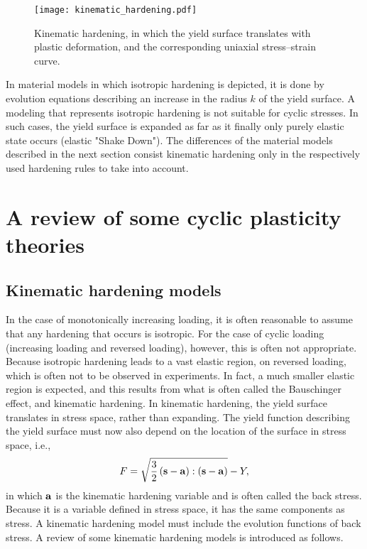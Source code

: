 \begin{figure}[htbp]
	\centering
	\texttt{[image: kinematic\_hardening.pdf]}
	\caption{Kinematic hardening, in which the yield surface translates with plastic deformation, and the corresponding uniaxial stress–strain curve.}
	\label{Fig:kinematic_hardening}
\end{figure}

In material models in which isotropic hardening is depicted, it is done by evolution equations describing an increase in the radius $k$ of the yield surface.
A modeling that represents isotropic hardening is not suitable for cyclic stresses.
In such cases, the yield surface is expanded as far as it finally only purely elastic state occurs (elastic "Shake Down").
The differences of the material models described in the next section consist kinematic hardening only in the respectively used hardening rules to take into account.

\section{A review of some cyclic plasticity theories}
\subsection{Kinematic hardening models}
\noindent
In the case of monotonically increasing loading, it is often reasonable to assume that any hardening that occurs is isotropic.
For the case of cyclic loading (increasing loading and reversed loading), however, this is often not appropriate.
Because isotropic hardening leads to a vast elastic region, on reversed loading, which is often not to be observed in experiments.
In fact, a much smaller elastic region is expected, and this results from what is often called the Bauschinger effect, and
kinematic hardening.
In kinematic hardening, the yield surface translates in stress space, rather than expanding.
The yield function describing the yield surface must now also depend on the location of the surface in stress space, i.e.,
\begin{equation}
F = \sqrt {\frac{3}{2}\left( {{\bf{s}} - {\bf{a}}} \right):\left( {{\bf{s}} - {\bf{a}}} \right)}  - Y,
\end{equation}
in which $\bf{a}$ is the kinematic hardening variable and is often called the back stress.
Because it is a variable defined in stress space, it has the same components as stress.
A kinematic hardening model must include the evolution functions of back stress.
A review of some kinematic hardening models is introduced as follows.

